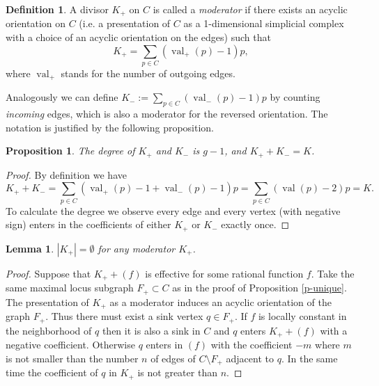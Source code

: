 \documentclass[12pt]{amsart}
\theoremstyle{plain}
\newtheorem{lemma}[theorem]{Lemma}
\newtheorem{proposition}[theorem]{Proposition}
\theoremstyle{definition}
\newtheorem{definition}[theorem]{Definition}
\theoremstyle{remark}
\newcommand{\<}{\langle}   %
\renewcommand{\>}{\rangle} %
\newcommand{\val}{\operatorname{val}}
\begin{document}
\begin{definition}\label{defKplus}
A divisor $K_+$ on $C$ is called a {\em moderator} if there exists an acyclic orientation
on $C$ (i.e. a presentation
of $C$ as a 1-dimensional simplicial complex with a choice of an acyclic orientation
on the edges) such that
\begin{equation}\label{eq:K_+}
K_+=\sum_{p\in C} (\val_+(p)-1)p,
\end{equation}
where $\val_+$ stands for the number of outgoing edges.
\end{definition}

Analogously we can define $K_-:=\sum_{p\in C} (\val_-(p)-1)p$ by counting {\em incoming} edges,
which is also a moderator for the reversed orientation.
The notation is justified by the following proposition.
\begin{proposition}
The degree of $K_+$ and $K_-$ is $g-1$, and $K_+ + K_-=K$.
\end{proposition}
\begin{proof}
By definition we have
$$K_++K_-=\sum_{p\in C} (\val_+(p)-1 +\val_-(p)-1)p=\sum_{p\in C} (\val(p)-2)p=K.$$
To calculate the degree we observe every edge and every vertex (with negative sign) enters
in the coefficients of
either $K_+$ or  $K_-$ exactly once.
\end{proof}

\begin{lemma}\label{modnoteff}
$|K_+|=\emptyset$ for any moderator $K_+$.
\end{lemma}
\begin{proof}
Suppose that $K_+ + (f)$ is effective for some rational function $f$.
Take the same maximal locus subgraph $F_+\subset C$ as in the proof of Proposition \ref{p-unique}.
The presentation of $K_+$ as a moderator induces an acyclic orientation of the graph $F_+$.
Thus there must exist a sink vertex $q\in F_+$. If $f$ is locally constant in the neighborhood
of $q$ then it is also a sink in $C$ and $q$ enters $K_+ + (f)$ with a negative coefficient.
Otherwise $q$ enters in $(f)$ with the coefficient $-m$ where $m$ is not smaller than the number $n$
of edges of $C\setminus F_+$ adjacent to $q$. In the same time the coefficient of $q$ in $K_+$
is not greater than $n$.
\end{proof}
\end{document}
